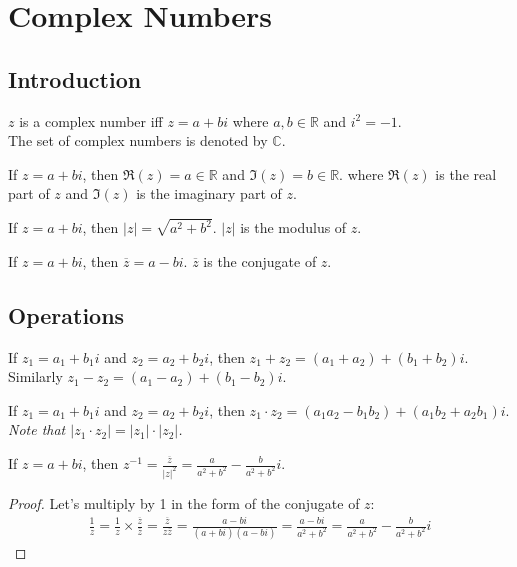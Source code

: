 \chapter{Complex Numbers}
\section{Introduction}
\begin{definition}
    $z$ is a complex number iff $z = a + bi$ where $a, b \in \mathbb{R}$ and $i^2 = -1$. \\
    The set of complex numbers is denoted by $\mathbb{C}$.
\end{definition}

\begin{definition}
    If $z = a + bi$, then $\Re(z) = a \in \mathbb{R}$ and $\Im(z) = b \in \mathbb{R}$. where $\Re(z)$ is the real part of $z$ and $\Im(z)$ is the imaginary part of $z$.
\end{definition}

\begin{definition}
    [Modulus]
    If $z = a + bi$, then $|z| = \sqrt{a^2 + b^2}$. $|z|$ is the modulus of $z$.
\end{definition}

\begin{definition}
    [Conjugate]
    If $z = a + bi$, then $\overline{z} = a - bi$. $\overline{z}$ is the conjugate of $z$.
\end{definition}
\section{Operations}
\begin{definition}
    If $z_1 = a_1 + b_1i$ and $z_2 = a_2 + b_2i$, then $z_1 + z_2 = (a_1 + a_2) + (b_1 + b_2)i$. \\
    Similarly $z_1 - z_2 = (a_1 - a_2) + (b_1 - b_2)i$.
\end{definition}

\begin{definition}
    [Multiplication]
    If $z_1 = a_1 + b_1i$ and $z_2 = a_2 + b_2i$, then $z_1 \cdot z_2 = (a_1a_2 - b_1b_2) + (a_1b_2 + a_2b_1)i$. \\
    \textit{    Note that $|z_1 \cdot z_2| = |z_1| \cdot |z_2|$.}
\end{definition}

\begin{definition}
    [Inversion]
    If $z = a + bi$, then $z^{-1} = \frac{\overline{z}}{|z|^2}= \frac{a}{a^2 + b^2} - \frac{b}{a^2 + b^2}i$.
\end{definition}
\begin{proof}
    Let's multiply by 1 in the form of the conjugate of $z$:
    \begin{align*}
        \frac{1}{z} = \frac{1}{z}\times \frac{\overline{z}}{\overline{z}} = \frac{\overline{z}}{z\overline{z}} = \frac{a - bi}{(a + bi)(a - bi)} = \frac{a - bi}{a^2 + b^2} = \frac{a}{a^2 + b^2} - \frac{b}{a^2 + b^2}i
    \end{align*}
\end{proof}

